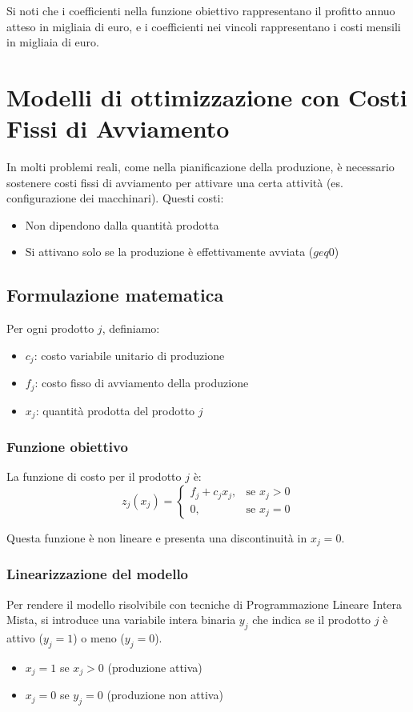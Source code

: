 Si noti che i coefficienti nella funzione obiettivo rappresentano il profitto annuo atteso in migliaia 
di euro, e i coefficienti nei vincoli rappresentano i costi mensili in migliaia di euro.

\section{Modelli di ottimizzazione con Costi Fissi di Avviamento}
In molti problemi reali, come nella pianificazione della produzione, 
è necessario sostenere costi fissi di avviamento per attivare una certa attività 
(es. configurazione dei macchinari). Questi costi:
\begin{itemize}
    \item Non dipendono dalla quantità prodotta
    \item Si attivano solo se la produzione è effettivamente avviata ($geq 0$)
\end{itemize}

\subsection{Formulazione matematica}

Per ogni prodotto $j$, definiamo:
\begin{itemize}
    \item $c_j$: costo variabile unitario di produzione
    \item $f_j$: costo fisso di avviamento della produzione
    \item $x_j$: quantità prodotta del prodotto $j$
\end{itemize}

\subsubsection{Funzione obiettivo}
La funzione di costo per il prodotto $j$ è:
\[
z_j(x_j) =
\begin{cases}
f_j + c_j x_j, & \text{se } x_j > 0 \\
0, & \text{se } x_j = 0
\end{cases}
\]

Questa funzione è non lineare e presenta una discontinuità in $x_j = 0$.

\subsubsection{Linearizzazione del modello}
Per rendere il modello risolvibile con tecniche di Programmazione Lineare Intera Mista, 
si introduce una variabile intera binaria $y_j$ che indica se il prodotto $j$ è attivo ($y_j = 1$) o meno ($y_j = 0$).
\begin{itemize}
    \item $x_j = 1$ se $x_j > 0$ (produzione attiva)
    \item $x_j = 0$ se $y_j = 0$ (produzione non attiva)
\end{itemize}

